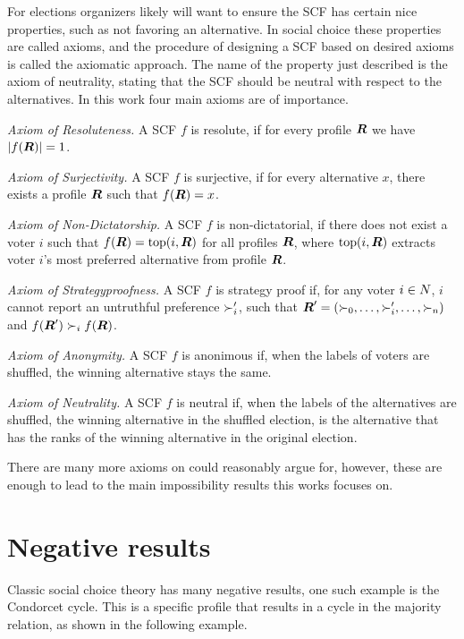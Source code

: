 For elections organizers likely will want to ensure the SCF has certain
nice properties, such as not favoring an alternative. In social choice these
properties are called axioms, and the procedure of designing a SCF based on
desired axioms is called the axiomatic approach. The name of the property just
described is the axiom of neutrality, stating that the SCF should be
neutral with respect to the alternatives. In this work four main axioms are of
importance.

\emph{Axiom of Resoluteness.} A SCF $f$ is resolute, if for every profile
$\boldsymbol{R}$ we have $|f(\boldsymbol{R})| = 1$.

\emph{Axiom of Surjectivity.} A SCF $f$ is surjective, if for every alternative
$x$, there exists a profile $\boldsymbol{R}$ such that
$f(\boldsymbol{R}) = x$.

\emph{Axiom of Non-Dictatorship.} A SCF $f$ is non-dictatorial, if there does not exist a voter $i$ such that $f(\boldsymbol{R}) = \textnormal{top}(i,\boldsymbol{R})$ for all profiles $\boldsymbol{R}$, where $\textnormal{top}(i,\boldsymbol{R})$  extracts voter $i$'s most preferred alternative from profile $\boldsymbol{R}$.

\emph{Axiom of Strategyproofness.} A SCF $f$ is strategy proof if, for any
voter $i \in N$, $i$ cannot report an untruthful preference
$\succ_i'$, such that  $\boldsymbol{R}' = (\succ_{0}, \dots,
	\succ_{i}', \dots, \succ_{n})$ and $f(\boldsymbol{R}') \succ_i
	f(\boldsymbol{R})$.

\emph{Axiom of Anonymity.} A SCF $f$ is anonimous if, when the labels of voters
are shuffled, the winning alternative stays the same.

\emph{Axiom of Neutrality.} A SCF $f$ is neutral if, when the labels of the
alternatives are shuffled, the winning alternative in the shuffled election, is
the alternative that has the ranks of the winning alternative in the original
election.

There are many more axioms on could reasonably argue for, however, these are
enough to lead to the main impossibility results this works focuses on.

\section{Negative results}
\label{preliminaries: negative results}

Classic social choice theory has many negative results, one such example is the
Condorcet cycle. This is a specific profile that results in a cycle in the
majority relation, as shown in the following example.

